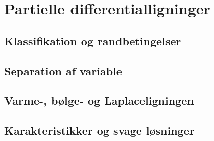 \chapter{Partielle differentialligninger}
\section{Klassifikation og randbetingelser}
\leavevmode\par

\section{Separation af variable}
\leavevmode\par

\section{Varme-, bølge- og Laplaceligningen}
\leavevmode\par

\section{Karakteristikker og svage løsninger}
\leavevmode\par

